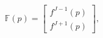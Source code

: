 \begin{equation}
\mathbb{F}\left( p\right) =\left[ 
\begin{array}{c}
f^{J-1}(p) \\ 
f^{J+1}(p)
\end{array}
\right] ,
\end{equation}

